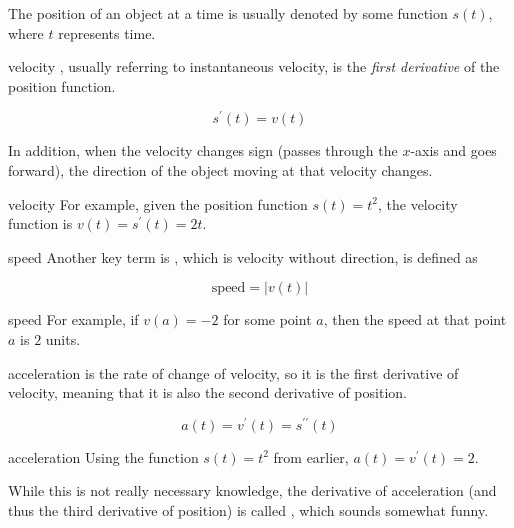 The position of an object at a time is usually denoted by some function \( s \left( t \right) \), where \( t \) represents time.

\begin{definition}{velocity}
    , usually referring to instantaneous velocity, is the \textit{first derivative} of the position function.

    \[ s^\prime \left( t \right) = v \left( t \right) \] 

    In addition, when the velocity changes sign (passes through the \( x \)-axis and goes forward), the direction of the object moving at that velocity changes.
\end{definition}

\begin{example}{velocity}
For example, given the position function \( s \left( t \right) = t^2 \), the velocity function is \( v \left( t \right) = s^\prime \left( t \right) = 2t \).
\end{example}

\begin{definition}{speed}
    Another key term is , which is velocity without direction, is defined as

    \[ \text{speed} = \vert v \left( t \right) \vert \]
\end{definition}

\begin{example}{speed}
    For example, if \( v \left( a \right) = -2 \) for some point \( a \), then the speed at that point \( a \) is \( 2 \) units.
\end{example}

\begin{definition}{acceleration}
     is the rate of change of velocity, so it is the first derivative of velocity, meaning that it is also the second derivative of position.

    \[ a \left( t \right) = v^\prime \left( t \right) = s^{\prime \prime} \left( t \right) \]
\end{definition}

\begin{example}{acceleration}
    Using the function \( s \left( t \right) = t^2 \) from earlier, \( a \left( t \right) = v^\prime \left( t \right) = 2 \).
\end{example}

While this is not really necessary knowledge, the derivative of acceleration (and thus the third derivative of position) is called , which sounds somewhat funny.

